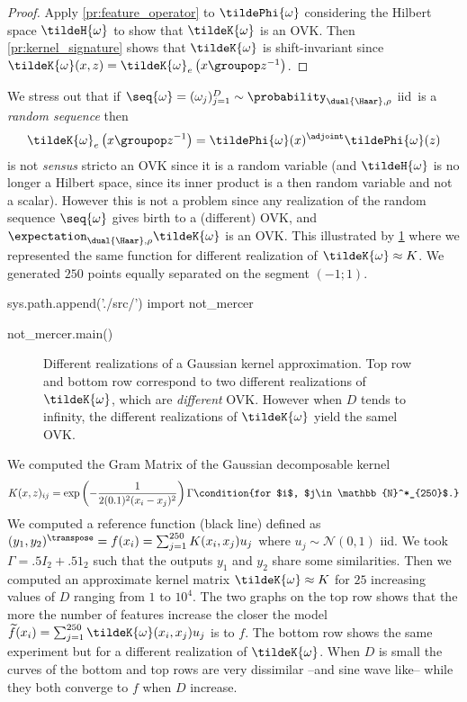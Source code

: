\begin{proof}
    Apply \cref{pr:feature_operator} to $\tildePhi{\omega}$ considering the
    Hilbert space $\tildeH{\omega}$ to show that $\tildeK{\omega}$ is an
    \acs{OVK}. Then \cref{pr:kernel_signature} shows that $\tildeK{\omega}$ is
    shift-invariant since
    $\tildeK{\omega}(x,z)=\tildeK{\omega}_e\left(x\groupop z^{-1}\right)$.
\end{proof}
We stress out that if $\seq{\omega}=(\omega_j)_{j=1}^D\sim
\probability_{\dual{\Haar},\rho}$ \ac{iid}~is a \emph{random sequence} then
\begin{dmath*}
    \tildeK{\omega}_e\left(x\groupop z^{-1}\right)
    =\tildePhi{\omega}(x)^{\adjoint}\tildePhi{\omega}(z)
\end{dmath*}
is not \emph{sensus} stricto an \acl{OVK} since it is a random variable (and
$\tildeH{\omega}$ is no longer a Hilbert space, since its inner product is a
then random variable and not a scalar). However this is not a problem since any
realization of the random sequence $\seq{\omega}$ gives birth to a (different)
\acl{OVK}, and $\expectation_{\dual{\Haar},\rho}\tildeK{\omega}$ is an
\acs{OVK}. This illustrated by \cref{fig:not_Mercer} where we represented the
same function for different realization of $\tildeK{\omega}\approx K$. We
generated $250$ points equally separated on the segment $(-1;1)$.
\begin{pycode}
sys.path.append('./src/')
import not_mercer

not_mercer.main()
\end{pycode}
\begin{figure}[htb]
    \caption[Different realizations of a Gaussian kernel
    approximation]{Different realizations of a Gaussian kernel approximation.
    Top row and bottom row correspond to two different realizations of
    $\tildeK{\omega}$, which are \emph{different} \acl{OVK}. However when $D$
    tends to infinity, the different realizations of $\tildeK{\omega}$ yield
    the samel \acs{OVK}.}
    \label{fig:not_Mercer}
\end{figure}
We computed the Gram Matrix of the Gaussian decomposable kernel
\begin{dmath*}
    K(x,z)_{ij}=\exp\left(-\frac{1}{2(0.1)^2(x_i - x_j)^2}\right)\Gamma
    \condition{for $i$, $j\in\mathbb{N}^*_{250}$.}
\end{dmath*}
We computed a reference function (black line) defined as $(y_1, y_2)^\transpose
= f(x_i)=\sum_{j=1}^{250}K(x_i,x_j)u_j$ where $u_j\sim\mathcal{N}(0,1)$
\ac{iid}. We took $\Gamma=.5 I_2 +.5 1_2$ such that the outputs $y_1$ and
$y_2$ share some similarities. Then we computed an approximate kernel matrix
$\tildeK{\omega}\approx K$ for $25$ increasing values of $D$ ranging from $1$
to $10^4$. The two graphs on the top row shows that the more the number of
features increase the closer the model
$\widetilde{f}(x_i)=\sum_{j=1}^{250}\tildeK{\omega}(x_i,x_j)u_j$ is to $f$. The
bottom row shows the same experiment but for a different realization of
$\tildeK{\omega}$. When $D$ is small the curves of the bottom and top rows are
very dissimilar --and sine wave like-- while they both converge to $f$ when $D$
increase.
